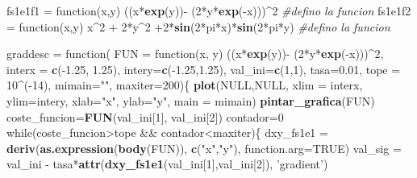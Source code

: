 \documentclass[]{article}
\newenvironment{Shaded}{\begin{snugshade}}{\end{snugshade}}
\newcommand{\KeywordTok}[1]{\textcolor[rgb]{0.13,0.29,0.53}{\textbf{{#1}}}}
\newcommand{\DataTypeTok}[1]{\textcolor[rgb]{0.13,0.29,0.53}{{#1}}}
\newcommand{\DecValTok}[1]{\textcolor[rgb]{0.00,0.00,0.81}{{#1}}}
\newcommand{\FloatTok}[1]{\textcolor[rgb]{0.00,0.00,0.81}{{#1}}}
\newcommand{\StringTok}[1]{\textcolor[rgb]{0.31,0.60,0.02}{{#1}}}
\newcommand{\CommentTok}[1]{\textcolor[rgb]{0.56,0.35,0.01}{\textit{{#1}}}}
\newcommand{\OtherTok}[1]{\textcolor[rgb]{0.56,0.35,0.01}{{#1}}}
\newcommand{\NormalTok}[1]{{#1}}
\begin{document}
\begin{Shaded}
\begin{Highlighting}[]
\NormalTok{fs1e1f1 =}\StringTok{ }\NormalTok{function(x,y) ((x*}\KeywordTok{exp}\NormalTok{(y))-}\StringTok{ }\NormalTok{(}\DecValTok{2}\NormalTok{*y*}\KeywordTok{exp}\NormalTok{(-x)))^}\DecValTok{2}  \CommentTok{#defino la funcion}
\NormalTok{fs1e1f2 =}\StringTok{ }\NormalTok{function(x,y) x^}\DecValTok{2} \NormalTok{+}\StringTok{  }\DecValTok{2}\NormalTok{*y^}\DecValTok{2} \NormalTok{+}\DecValTok{2}\NormalTok{*}\KeywordTok{sin}\NormalTok{(}\DecValTok{2}\NormalTok{*pi*x)*}\KeywordTok{sin}\NormalTok{(}\DecValTok{2}\NormalTok{*pi*y)  }\CommentTok{#defino la funcion}

\NormalTok{graddesc =}\StringTok{ }\NormalTok{function(}
  \DataTypeTok{FUN =} \NormalTok{function(x, y) ((x*}\KeywordTok{exp}\NormalTok{(y))-}\StringTok{ }\NormalTok{(}\DecValTok{2}\NormalTok{*y*}\KeywordTok{exp}\NormalTok{(-x)))^}\DecValTok{2}\NormalTok{, }\DataTypeTok{interx =} \KeywordTok{c}\NormalTok{(-}\FloatTok{1.25}\NormalTok{, }\FloatTok{1.25}\NormalTok{), }\DataTypeTok{intery=}\KeywordTok{c}\NormalTok{(-}\FloatTok{1.25}\NormalTok{,}\FloatTok{1.25}\NormalTok{),}
  \DataTypeTok{val_ini=}\KeywordTok{c}\NormalTok{(}\DecValTok{1}\NormalTok{,}\DecValTok{1}\NormalTok{), }\DataTypeTok{tasa=}\FloatTok{0.01}\NormalTok{, }\DataTypeTok{tope =} \DecValTok{10}\NormalTok{^(-}\DecValTok{14}\NormalTok{), }\DataTypeTok{mimain=}\StringTok{""}\NormalTok{, }\DataTypeTok{maxiter=}\DecValTok{200}\NormalTok{)\{}
    \KeywordTok{plot}\NormalTok{(}\OtherTok{NULL}\NormalTok{,}\OtherTok{NULL}\NormalTok{, }\DataTypeTok{xlim =} \NormalTok{interx, }\DataTypeTok{ylim=}\NormalTok{intery, }\DataTypeTok{xlab=}\StringTok{"x"}\NormalTok{, }\DataTypeTok{ylab=}\StringTok{"y"}\NormalTok{, }\DataTypeTok{main =} \NormalTok{mimain)}
    \KeywordTok{pintar_grafica}\NormalTok{(FUN)}
    \NormalTok{coste_funcion=}\KeywordTok{FUN}\NormalTok{(val_ini[}\DecValTok{1}\NormalTok{], val_ini[}\DecValTok{2}\NormalTok{])}
    \NormalTok{contador=}\DecValTok{0}
    \NormalTok{while(coste_funcion>tope &&}\StringTok{ }\NormalTok{contador<maxiter)\{}
      \NormalTok{dxy_fs1e1 =}\StringTok{ }\KeywordTok{deriv}\NormalTok{(}\KeywordTok{as.expression}\NormalTok{(}\KeywordTok{body}\NormalTok{(FUN)), }\KeywordTok{c}\NormalTok{(}\StringTok{"x"}\NormalTok{,}\StringTok{"y"}\NormalTok{), }\DataTypeTok{function.arg=}\OtherTok{TRUE}\NormalTok{)}
      \NormalTok{val_sig =}\StringTok{ }\NormalTok{val_ini -}\StringTok{ }\NormalTok{tasa*}\KeywordTok{attr}\NormalTok{(}\KeywordTok{dxy_fs1e1}\NormalTok{(val_ini[}\DecValTok{1}\NormalTok{],val_ini[}\DecValTok{2}\NormalTok{]), }\StringTok{'gradient'}\NormalTok{)}

\end{Highlighting}
\end{Shaded}
\end{document}
